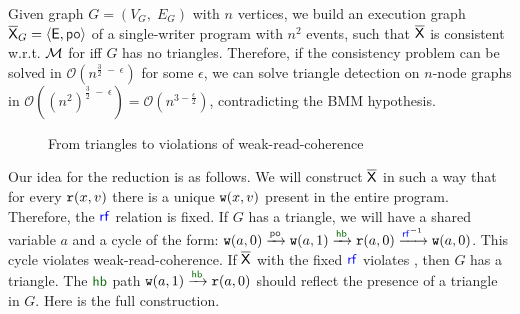 Given graph $G = (V_G,\;E_G)$ with $n$ vertices, we build an execution graph $\expartial_G = \tuple{\E, \po}$ of a single-writer program with $n^2$ events, such that $\overline{\mathsf{\color{black}X}}$ is consistent w.r.t. $\mathcal{M}$ for iff $G$ has no triangles. Therefore, if the consistency problem can be solved in $\mathcal{O}(n^{\frac{3}{2}\;-\;\epsilon})$ for some $\epsilon$, 
we can solve triangle detection on $n$-node graphs in $\mathcal{O}((n^2)^{\frac{3}{2}\;-\;\epsilon}) = \mathcal{O}(n^{3 - \frac{\epsilon}{2}})$,  contradicting the BMM hypothesis. 
\begin{figure}
  \centering%
  \caption{From triangles to violations of weak-read-coherence} 
  \label{fig:super-linear-illustration}
\end{figure}

Our idea for the reduction is as follows. We will construct $\overline{\mathsf{\color{black}X}}$ in such a way that for every $\mathtt{r}(x, v)$ there is a unique $\mathtt{w}(x, v)$ present in the entire program. Therefore, the $\rf$ relation is fixed. If $G$ has a triangle, we will have a shared variable $a$ and a cycle of the form: $\wt(a, 0) \xrightarrow{\po} \wt(a, 1) \xrightarrow{\hb} \rd(a, 0) \xrightarrow{\rf^{-1}} \wt(a, 0)$. This cycle violates weak-read-coherence.
If $\overline{\mathsf{\color{black}X}}$ with the fixed $\rf$ violates  
\WRCoh{}, then $G$ has a triangle.  The $\hb$ path $\wt(a, 1) \xrightarrow{\hb} \rd(a, 0)$ should reflect the presence of a triangle in $G$. Here is the full construction.

